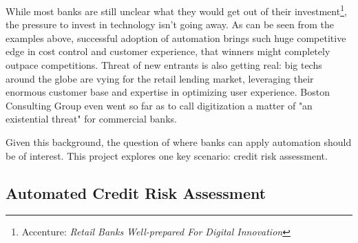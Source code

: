 \documentclass[11pt, twocolumn]{article}
\begin{document}
While most banks are still unclear what they would get out of their investment\footnote{Accenture: \textit{Retail Banks Well-prepared For Digital Innovation}}, the pressure to invest in technology isn't going away. As can be seen from the examples above, successful adoption of automation brings such huge competitive edge in cost control and customer experience, that winners might completely outpace competitions. Threat of new entrants is also getting real: big techs around the globe are vying for the retail lending market, leveraging their enormous customer base and expertise in optimizing user experience. Boston Consulting Group even went so far as to call digitization a matter of "an existential threat" for commercial banks.

Given this background, the question of where banks can apply automation should be of interest. This project explores one key scenario: credit risk assessment.

\subsection{Automated Credit Risk Assessment}
\end{document}
